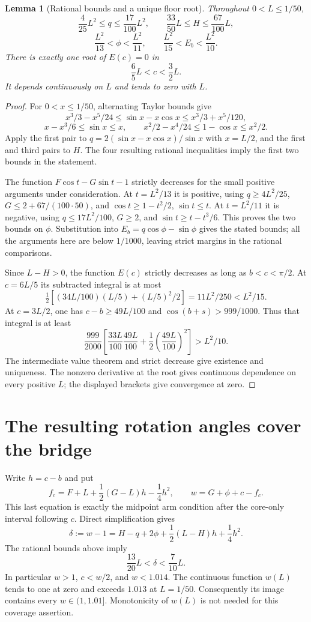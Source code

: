 \documentclass[11pt]{article}
\newtheorem{lemma}[theorem]{Lemma}
\begin{document}
\begin{lemma}[Rational bounds and a unique floor root]\label{lem:bounds}
Throughout $0<L\le1/50$,
\[
 \frac4{25}L^2\le q\le\frac{17}{100}L^2,
 \qquad \frac{33}{50}L\le H\le\frac{67}{100}L,
\]
\[
 \frac{L^2}{13}<\phi<\frac{L^2}{11},\qquad
 \frac{L^2}{15}<E_b<\frac{L^2}{10}.
\]
There is exactly one root of $E(c)=0$ in
\[
 \frac65L<c<\frac32L.
\]
It depends continuously on $L$ and tends to zero with $L$.
\end{lemma}
\begin{proof}
For $0<x\le1/50$, alternating Taylor bounds give
\[
 x^3/3-x^5/24\le\sin x-x\cos x\le x^3/3+x^5/120,
\]
\[
 x-x^3/6\le\sin x\le x,\qquad
 x^2/2-x^4/24\le1-\cos x\le x^2/2.
\]
Apply the first pair to $q=2(\sin x-x\cos x)/\sin x$ with $x=L/2$, and the first and third pairs to $H$. The four resulting rational inequalities imply the first two bounds in the statement.

The function $F\cos t-G\sin t-1$ strictly decreases for the small positive arguments under consideration. At $t=L^2/13$ it is positive, using $q\ge4L^2/25$, $G\le2+67/(100\cdot50)$, and $\cos t\ge1-t^2/2$, $\sin t\le t$. At $t=L^2/11$ it is negative, using $q\le17L^2/100$, $G\ge2$, and $\sin t\ge t-t^3/6$. This proves the two bounds on $\phi$. Substitution into $E_b=q\cos\phi-\sin\phi$ gives the stated bounds; all the arguments here are below $1/1000$, leaving strict margins in the rational comparisons.

Since $L-H>0$, the function $E(c)$ strictly decreases as long as $b<c<\pi/2$. At $c=6L/5$ its subtracted integral is at most
\[
 \tfrac12[(34L/100)(L/5)+(L/5)^2/2]=11L^2/250<L^2/15.
\]
At $c=3L/2$, one has $c-b\ge49L/100$ and $\cos(b+s)>999/1000$. Thus that integral is at least
\[
 \frac{999}{2000}\left[\frac{33L}{100}\frac{49L}{100}
                         +\frac12\left(\frac{49L}{100}\right)^2\right]>L^2/10.
\]
The intermediate value theorem and strict decrease give existence and uniqueness. The nonzero derivative at the root gives continuous dependence on every positive $L$; the displayed brackets give convergence at zero.
\end{proof}

\section{The resulting rotation angles cover the bridge}
Write $h=c-b$ and put
\[
 f_c=F+L+\frac12(G-L)h-\frac14h^2,
 \qquad w=G+\phi+c-f_c.
\]
This last equation is exactly the midpoint arm condition after the core-only interval following $c$. Direct simplification gives
\[
 \delta:=w-1=H-q+2\phi+\frac12(L-H)h+\frac14h^2.
\]
The rational bounds above imply
\[
 \frac{13}{20}L<\delta<\frac7{10}L.
\]
In particular $w>1$, $c<w/2$, and $w<1.014$. The continuous function $w(L)$ tends to one at zero and exceeds $1.013$ at $L=1/50$. Consequently its image contains every $w\in(1,1.01]$. Monotonicity of $w(L)$ is not needed for this coverage assertion.
\end{document}

